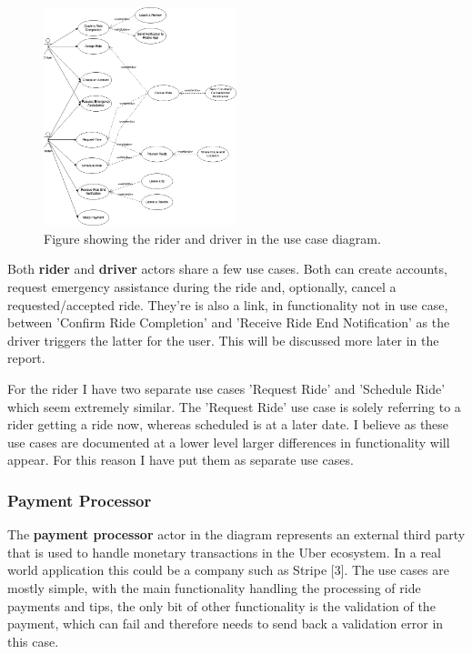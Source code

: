 \documentclass{article}
\begin{document}
    \begin{figure}[H]
      \centering
      \includegraphics[width=0.5\textwidth]{assets/customer_use_case.drawio.png}
      \caption{Figure showing the rider and driver in the use case diagram.}
      \label{fig:customerUseCase}
    \end{figure}

    Both \textbf{rider} and \textbf{driver} actors share a few use cases. Both can create accounts, request emergency assistance during the ride and,
    optionally, cancel a requested/accepted ride. They're is also a link, in functionality not in use case, between 'Confirm Ride Completion' and 
    'Receive Ride End Notification' as the driver triggers the latter for the user. This will be discussed more later in the report.

    For the rider I have two separate use cases 'Request Ride' and 'Schedule Ride' which seem extremely similar. The 'Request Ride' use case is solely 
    referring to a rider getting a ride now, whereas scheduled is at a later date. I believe as these use cases are documented at a lower level larger 
    differences in functionality will appear. For this reason I have put them as separate use cases.

    \newpage
    \subsubsection{Payment Processor}
      The \textbf{payment processor} actor in the diagram represents an external third party that is used to handle monetary transactions in the Uber ecosystem.
      In a real world application this could be a company such as Stripe [3]. The use cases are mostly simple, with the main functionality handling the processing of 
      ride payments and tips, the only bit of other functionality is the validation of the payment, which can fail and therefore needs to send back a 
      validation error in this case.
\end{document}
